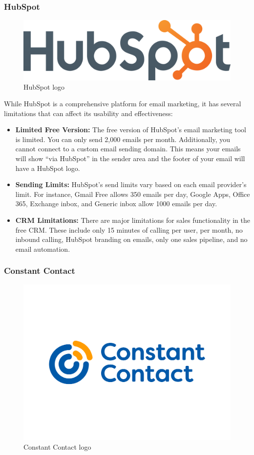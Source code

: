 \subsubsection{HubSpot}

\begin{figure}[ht]
    \centering
    \includegraphics[width=0.5\linewidth]{Images/logos/hubspot.png}
    \caption{HubSpot logo}
    \label{fig:HubSpot Logo}
\end{figure}

While HubSpot is a comprehensive platform for email marketing, it has several limitations that can affect its usability and effectiveness:

\vspace{10pt}

\begin{itemize}
\item \textbf{Limited Free Version:} The free version of HubSpot’s email marketing tool is limited. You can only send 2,000 emails per month. Additionally, you cannot connect to a custom email sending domain. This means your emails will show “via HubSpot” in the sender area and the footer of your email will have a HubSpot logo.

\item \textbf{Sending Limits:} HubSpot’s send limits vary based on each email provider’s limit. For instance, Gmail Free allows 350 emails per day, Google Apps, Office 365, Exchange inbox, and Generic inbox allow 1000 emails per day.

\item \textbf{CRM Limitations:} There are major limitations for sales functionality in the free CRM. These include only 15 minutes of calling per user, per month, no inbound calling, HubSpot branding on emails, only one sales pipeline, and no email automation.
\end{itemize}

\clearpage


\subsubsection{Constant Contact}

\begin{figure}[ht]
    \centering
    \includegraphics[width=0.5\linewidth]{Images/logos/Constant-Contact.png}
    \caption{Constant Contact logo}
    \label{Constant Contact Logo}
\end{figure}

